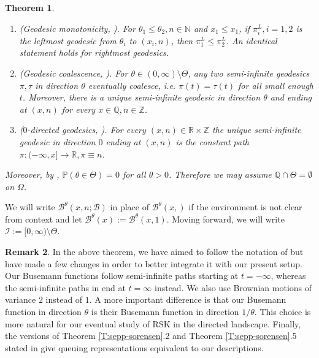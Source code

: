 \documentclass[11pt]{article}
\newcommand{\Z}{\mathbb{Z}}
\newcommand{\Q}{\mathbb{Q}}
\newcommand{\N}{\mathbb{N}}
\newcommand{\R}{\mathbb{R}}
\newcommand{\Om}{\Omega}
\newcommand{\cB}{\mathcal{B}}
\newcommand{\cI}{\mathcal{I}}
\newcommand{\X}{\times}
\newcommand{\smin}{\setminus}
\renewcommand{\P}{\mathbb{P}}
\newtheorem{theorem}{Theorem}[section]
\theoremstyle{definition} %
\newtheorem{remark}[theorem]{Remark}
\theoremstyle{remark} %
\begin{document}
\begin{theorem}
\begin{enumerate}
		\item (Geodesic monotonicity, \cite[Theorem 4.3(iii)]{seppalainen2023busemann}). For $\theta_1 \le \theta_2, n \in \N$ and $x_1 \le x_1$, if $\pi^L_i, i = 1, 2$ is the leftmost geodesic from $\theta_i$ to $(x_i, n)$, then $\pi^L_1 \le \pi^L_2$. An identical statement holds for rightmost geodesics.
		\item (Geodesic coalescence, \cite[Theorem 2.8(i)]{seppalainen2023global}). For $\theta \in (0, \infty) \setminus \Theta$, any two semi-infinite geodesics $\pi, \tau$ in direction $\theta$ eventually coalesce, i.e. $\pi(t) = \tau(t)$ for all small enough $t$. Moreover, there is a unique semi-infinite geodesic in direction $\theta$ and ending at $(x, n)$ for every $x \in \Q, n \in \Z$.
		\item ($0$-directed geodesics, \cite[Theorem 4.3(iv, vi)]{seppalainen2023busemann}). For every $(x, n) \in \R \X \Z$ the unique semi-infinite geodesic in direction $0$ ending at $(x, n)$ is the constant path $\pi:(-\infty, x] \to \R, \pi \equiv n$. 
	\end{enumerate}
Moreover, by \cite[Theorem 2.5]{seppalainen2023global}, $\P(\theta \in \Theta) = 0$ for all $\theta > 0$. Therefore we may assume $\Q \cap \Theta = \emptyset$ on $\Om$. 
\end{theorem}
We will write $\cB^\theta(x, n; \cB)$ in place of $\cB^\theta(x, )$ if the environment is not clear from context and let $\cB^\theta(x) := \cB^\theta(x, 1)$. Moving forward, we will write $\cI:= [0, \infty) \smin \Theta$.

\begin{remark}
\label{R:sepp-notation}
In the above theorem, we have aimed to follow the notation of \cite{seppalainen2023busemann, seppalainen2023global} but have made a few changes in order to better integrate it with our present setup. Our Busemann functions follow semi-infinite paths starting at $t = -\infty$, whereas the semi-infinite paths in \cite{seppalainen2023busemann, seppalainen2023global} end at $t = \infty$ instead. We also use Brownian motions of variance $2$ instead of $1$. A more important difference is that our Busemann function in direction $\theta$ is their Busemann function in direction $1/\theta$. This choice is more natural for our eventual study of RSK in the directed landscape. Finally, the versions of Theorem \ref{T:sepp-sorensen}.2  and Theorem \ref{T:sepp-sorensen}.5 stated in \cite{seppalainen2023global} give queuing representations equivalent to our descriptions.
\end{remark}
\end{document}
